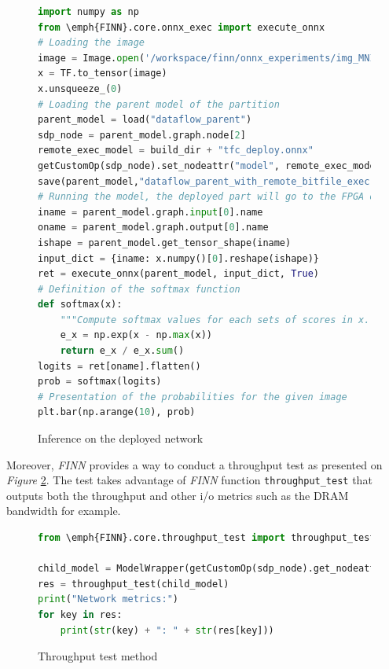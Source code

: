 \begin{figure}[htbp]
\centering
\begin{lstlisting}[language=Python]
import numpy as np
from \emph{FINN}.core.onnx_exec import execute_onnx
# Loading the image
image = Image.open('/workspace/finn/onnx_experiments/img_MNIST.png')
x = TF.to_tensor(image)
x.unsqueeze_(0)
# Loading the parent model of the partition
parent_model = load("dataflow_parent")
sdp_node = parent_model.graph.node[2]
remote_exec_model = build_dir + "tfc_deploy.onnx"
getCustomOp(sdp_node).set_nodeattr("model", remote_exec_model)
save(parent_model,"dataflow_parent_with_remote_bitfile_exec")
# Running the model, the deployed part will go to the FPGA once the node is reached
iname = parent_model.graph.input[0].name
oname = parent_model.graph.output[0].name
ishape = parent_model.get_tensor_shape(iname)
input_dict = {iname: x.numpy()[0].reshape(ishape)}
ret = execute_onnx(parent_model, input_dict, True)
# Definition of the softmax function
def softmax(x):
    """Compute softmax values for each sets of scores in x."""
    e_x = np.exp(x - np.max(x))
    return e_x / e_x.sum()
logits = ret[oname].flatten()
prob = softmax(logits)
# Presentation of the probabilities for the given image
plt.bar(np.arange(10), prob)
\end{lstlisting}
\caption[Deployed Inference]{Inference on the deployed network}
  \label{fig:DeployedInference}
\end{figure}

Moreover, \emph{FINN} provides a way to conduct a throughput test as presented on \emph{Figure} \ref{fig:ThroughputTest}. The test takes advantage of \emph{FINN} function \texttt{throughput\_test} that outputs both the throughput and other i/o metrics such as the DRAM bandwidth for example.

\begin{figure}[htbp]
\centering
\begin{lstlisting}[language=Python]
from \emph{FINN}.core.throughput_test import throughput_test

child_model = ModelWrapper(getCustomOp(sdp_node).get_nodeattr("model"))
res = throughput_test(child_model)
print("Network metrics:")
for key in res:
    print(str(key) + ": " + str(res[key]))
\end{lstlisting}
\caption[Throughput Test]{Throughput test method}
  \label{fig:ThroughputTest}
\end{figure}

